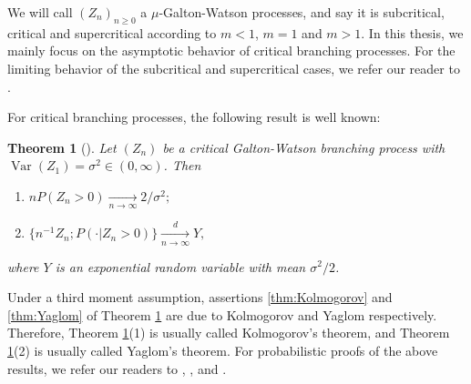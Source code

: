 \documentclass[UTF8]{pkuthss}
\theoremstyle{plain}
\newtheorem{thm}{Theorem}[section]
\theoremstyle{definition}
\numberwithin{equation}{section}
\begin{document}
	We will call $(Z_n)_{n\geq 0}$ a $\mu$-Galton-Watson processes, and say it is subcritical, critical and supercritical according to $m < 1$, $m = 1$ and $m >1$. 
	In this thesis, we mainly focus on the asymptotic behavior of critical branching processes. 
	For the limiting behavior of the subcritical and supercritical cases, we refer our reader to \cite{AthreyaNey1972Branching}.

	For critical branching processes, the following result is well known:
\begin{thm}[\cite{KestenNeySpitzer1966GaltonWatson}] 
\label{thm: Kolmogorov and Yaglom theorem}
	Let $(Z_n)$ be a critical Galton-Watson branching process with $\operatorname{Var}(Z_1) = \sigma^2 \in (0,\infty)$. Then
	\begin{enumerate}
		\item \label{thm:Kolmogorov} 
		$n P (Z_n>0) \xrightarrow[n \to \infty]{} 2/\sigma^2;$
		\item \label{thm:Yaglom}
		$\{n^{-1}Z_n; P(\cdot | Z_n>0)\}\xrightarrow[n \to \infty]{d} Y,$
	\end{enumerate}
	where $Y$ is an exponential random variable with mean $\sigma^2/2$.
\end{thm}

\begin{comment}
\begin{thm}
\label{thm: Kolmogorov and Yaglom theorem}
	Let $(Z_n)$ be a critical Galton-Watson branching process with $\operatorname{Var}(Z_1) = 2c \in (0,\infty)$. Then 
\begin{itemize}
\item[(1)]
	$n P(Z_n > 0)\xrightarrow[n\to \infty]{} c^{-1}$,
\item[(2)]
	$P_1(n^{-1}Z_n > r|Z_n >0) \xrightarrow[n\to \infty]{} e^{-r/c}, \quad r\geq 0$.
\end{itemize}
\end{thm}
\end{comment}
	Under a third moment assumption, assertions \eqref{thm:Kolmogorov} and \eqref{thm:Yaglom} of Theorem \ref{thm: Kolmogorov and Yaglom theorem} are due to Kolmogorov \cite{Kolmogorov1938Zur} and Yaglom \cite{Yaglom1947Certain} respectively.
	Therefore, Theorem \ref{thm: Kolmogorov and Yaglom theorem}(1) is usually called Kolmogorov's theorem, and Theorem \ref{thm: Kolmogorov and Yaglom theorem}(2) is usually called Yaglom's theorem.
	For probabilistic proofs of the above results, we refer our readers to \cite{Geiger1999Elementary}, \cite{Geiger2000New}, \cite{LyonsPemantlePeres1995Conceptual} and \cite{RenSongSun20182spine}. 
\end{document}
